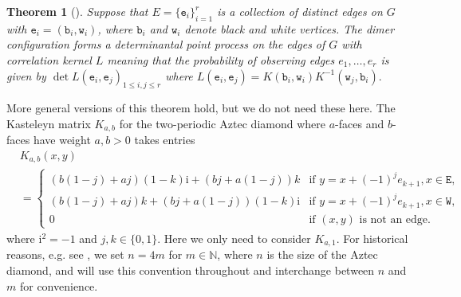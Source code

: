 \documentclass[11pt,twoside]{amsart}
\theoremstyle{plain}
\newtheorem{thm}{Theorem}[section]
\numberwithin{quest}{section}
\theoremstyle{remark}
\numberwithin{rem}{section}
\theoremstyle{definition}
\begin{document}
	\begin{thm}[\cite{Ken97,Joh17}]\label{localstatisticsthm}
		Suppose that $E=\{\mathtt{e}_i\}_{i=1}^r$ is a collection of distinct edges on $G$ with $\mathtt{e}_i=(\mathtt{b}_i,\mathtt{w}_i)$, where $\mathtt{b}_i$ and $\mathtt{w}_i$ denote black and white vertices. The dimer configuration forms a determinantal point process on the edges of $G$ with correlation kernel $L$ meaning that the probability of observing edges $e_1,\dots, e_r$ is given by 
		$\det L(\mathtt{e}_i,\mathtt{e}_j)_{1 \leq i,j \leq r}$
		where
		$L(\mathtt{e}_i,\mathtt{e}_j) = K({\mathtt{b}_i,\mathtt{w}_i}) K^{-1}({\mathtt{w}_j,\mathtt{b}_i}).$
	\end{thm}
	More general versions of this theorem hold, but we do not need these here. The Kasteleyn matrix $K_{a,b}$ for the two-periodic Aztec diamond where $a$-faces and $b$-faces have weight $a, b > 0$ takes entries
	\begin{equation} \label{pf:K}\begin{split}
			&K_{a,b}(x,y)\\&=\left\{\begin{array}{ll}
				(b (1-j)+a j)(1-k)\mathrm{i}+(b j+a(1-j))k & \mbox{if } y=x+(-1)^j e_{k+1}, x \in \mathtt{E}, \\
				(b (1-j)+a j)k+(b j+a(1-j))(1-k)\mathrm{i} & \mbox{if } y=x+(-1)^j e_{k+1}, x \in \mathtt{W}, \\
				0 & \mbox{if $(x,y)$ is not an edge.}
			\end{array} \right.
		\end{split}
	\end{equation}
	where $\mathrm{i}^2=-1$ and $j,k\in \{0,1\}$. Here we only need to consider $K_{a, 1}$.  For historical reasons, e.g. see \cite{CJ16}, we set $n=4m$ for $m \in \mathbb{N}$, where $n$ is the size of the Aztec diamond, and will use this convention throughout and interchange between $n$ and $m$ for convenience. 
	
\end{document}
